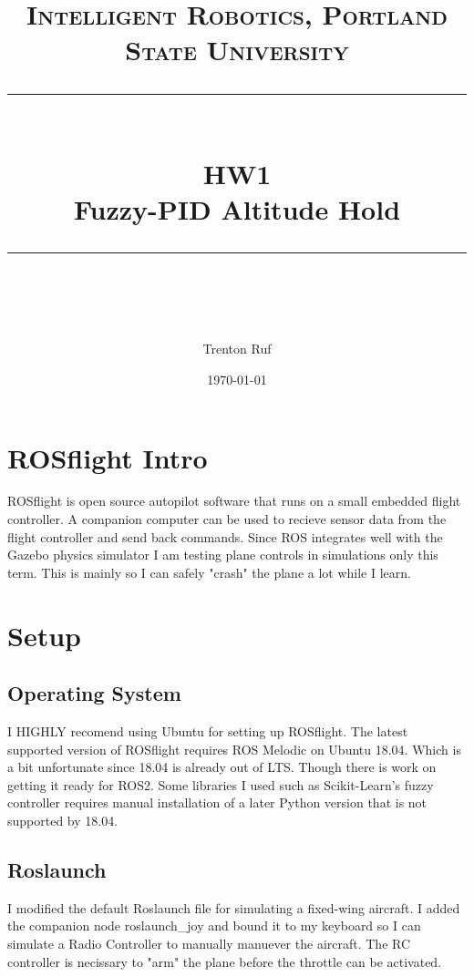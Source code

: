 \documentclass[11pt]{scrartcl} %
\title{	
	\normalfont\normalsize
	\textsc{Intelligent Robotics, Portland State University}\\ %
	\vspace{25pt} %
	\rule{\linewidth}{0.5pt}\\ %
	\vspace{20pt} %
	{\huge HW1}\\ %
	\vspace{4pt} %
	{\large Fuzzy-PID Altitude Hold}\\ %
	\vspace{12pt} %
	\rule{\linewidth}{2pt}\\ %
	\vspace{12pt} %
}
\author{\LARGE Trenton Ruf} %
\date{\normalsize \today} %
\begin{document}
\maketitle %




\renewcommand\thesubsection{\Roman{subsection}}
\section{ROSflight Intro}

ROSflight is open source autopilot software that runs on a small embedded flight controller. A companion computer can be used to recieve sensor data from the flight controller and send back commands. Since ROS integrates well with the Gazebo physics simulator I am testing plane controls in simulations only this term. This is mainly so I can safely "crash" the plane a lot while I learn.

\section{Setup}
\subsection{Operating System}
I HIGHLY recomend using Ubuntu for setting up ROSflight.
The latest supported version of ROSflight requires ROS Melodic on Ubuntu 18.04. Which is a bit unfortunate since 18.04 is already out of LTS. Though there is work on getting it ready for ROS2. Some libraries I used such as Scikit-Learn's fuzzy controller requires manual installation of a later Python version that is not supported by 18.04.

\subsection{Roslaunch}
I modified the default Roslaunch file for simulating a fixed-wing aircraft. I added the companion node roslaunch_joy and bound it to my keyboard so I can simulate a Radio Controller to manually manuever the aircraft. The RC controller is necissary to "arm" the plane before the throttle can be activated.



\end{document}
